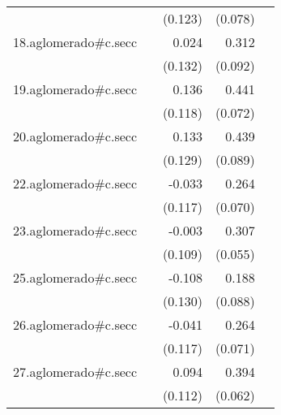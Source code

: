{\begin{longtable}{l*{4}{D{.}{.}{-1}}}
            &                     &     (0.123)         &     (0.078)         &                     \\
\addlinespace
18.aglomerado#c.secc&                     &       0.024         &       0.312\sym{***}&                     \\
            &                     &     (0.132)         &     (0.092)         &                     \\
\addlinespace
19.aglomerado#c.secc&                     &       0.136         &       0.441\sym{***}&                     \\
            &                     &     (0.118)         &     (0.072)         &                     \\
\addlinespace
20.aglomerado#c.secc&                     &       0.133         &       0.439\sym{***}&                     \\
            &                     &     (0.129)         &     (0.089)         &                     \\
\addlinespace
22.aglomerado#c.secc&                     &      -0.033         &       0.264\sym{***}&                     \\
            &                     &     (0.117)         &     (0.070)         &                     \\
\addlinespace
23.aglomerado#c.secc&                     &      -0.003         &       0.307\sym{***}&                     \\
            &                     &     (0.109)         &     (0.055)         &                     \\
\addlinespace
25.aglomerado#c.secc&                     &      -0.108         &       0.188\sym{*}  &                     \\
            &                     &     (0.130)         &     (0.088)         &                     \\
\addlinespace
26.aglomerado#c.secc&                     &      -0.041         &       0.264\sym{***}&                     \\
            &                     &     (0.117)         &     (0.071)         &                     \\
\addlinespace
27.aglomerado#c.secc&                     &       0.094         &       0.394\sym{***}&                     \\
            &                     &     (0.112)         &     (0.062)         &                     \\

\end{longtable}}
